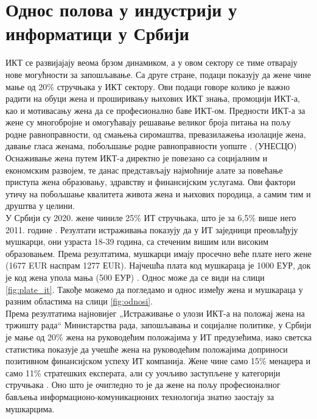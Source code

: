 \documentclass[a4paper]{article}
\begin{document}
\section{Однос полова у индустрији у информатици у Србији}

ИКТ се развијајају веома брзом динамиком, а у овом сектору се тиме отварају нове могућности за 
запошљавање. Са друге стране, подаци показују да жене чине мање од 20\% стручњака у ИКТ сектору. 
Ови подаци говоре колико је важно радити на обуци жена и проширивању њихових ИКТ знања, промоцији 
ИКТ-а, као и мотивасању жена да се професионално баве ИКТ-ом. Предности ИКТ-а за жене су 
многобројне и омогућавају решавање великог броја питања на пољу родне равноправности, од смањења 
сиромаштва, превазилажења изолације жена, давање гласа женама, побољшање родне равноправности 
уопште \cite{vlada_ikt}. (УНЕСЦО) Оснаживање жена путем ИКТ-а директно је повезано са социјалним и
економским развојем, те данас представљају најмоћније алате за повећање приступа жена образовању, 
здравству и финансијским услугама. Ови фактори утичу на побољшање квалитета живота жена и њихових 
породица, а самим тим и друштва у целини. \\
У Србији су 2020. жене чиниле 25\% ИТ стручњака, што је за 6,5\% више него 2011. године 
\cite{danas_it}. Резултати истраживања показују да у ИТ заједници преовлађују мушкарци, они 
узраста 18-39 година, са стеченим вишим или високим образовањем. Према резултатима, мушкарци имају
просечно веће плате него жене (1677 EUR наспрам 1277 ЕUR). Најчешћа плата код мушкараца је 1000 
ЕУР, док је код жена упола мања (500 ЕУР) \cite{puls_srpske_it}. Однос може да се види на слици 
\ref{fig:plate_it}. Такође можемо да погледамо и однос између жена и мушкараца у разним областима 
на слици \ref{fig:odnosi}.\\

Према резултатима најновијег „Истраживање о улози ИКТ-а на положај жена на тржишту рада“ 
Министарства рада, запошљавања и социјалне политике, у Србији је мање од 20\% жена на руководећим 
положајима у ИТ предузећима, иако светска статистика показује да учешће жена на руководећим 
положајима доприноси позитивном финансијском успеху ИТ компанија.
Жене чине само 15\% менаџера и само 11\% стратешких експерата, али су уочљиво заступљене у 
категорији стручњака \cite{dijalog_it}. Оно што је очигледно то је да жене на пољу професионалног 
бављења информационо-комуникационих технологија знатно заостају за мушкарцима.\\
\end{document}
